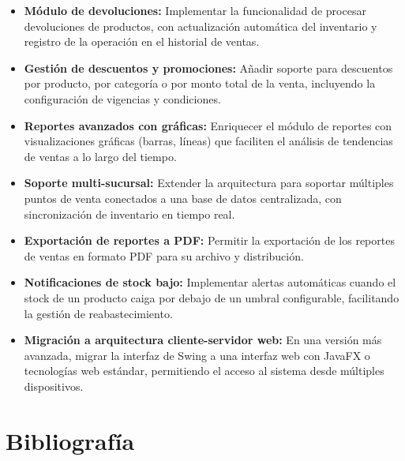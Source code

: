 \documentclass[12pt,a4paper]{report}
\begin{document}
\begin{itemize}
    \item \textbf{Módulo de devoluciones:} Implementar la funcionalidad de procesar devoluciones de productos, con actualización automática del inventario y registro de la operación en el historial de ventas.
    \item \textbf{Gestión de descuentos y promociones:} Añadir soporte para descuentos por producto, por categoría o por monto total de la venta, incluyendo la configuración de vigencias y condiciones.
    \item \textbf{Reportes avanzados con gráficas:} Enriquecer el módulo de reportes con visualizaciones gráficas (barras, líneas) que faciliten el análisis de tendencias de ventas a lo largo del tiempo.
    \item \textbf{Soporte multi-sucursal:} Extender la arquitectura para soportar múltiples puntos de venta conectados a una base de datos centralizada, con sincronización de inventario en tiempo real.
    \item \textbf{Exportación de reportes a PDF:} Permitir la exportación de los reportes de ventas en formato PDF para su archivo y distribución.
    \item \textbf{Notificaciones de stock bajo:} Implementar alertas automáticas cuando el stock de un producto caiga por debajo de un umbral configurable, facilitando la gestión de reabastecimiento.
    \item \textbf{Migración a arquitectura cliente-servidor web:} En una versión más avanzada, migrar la interfaz de Swing a una interfaz web con JavaFX o tecnologías web estándar, permitiendo el acceso al sistema desde múltiples dispositivos.
\end{itemize}

\chapter{Bibliografía}
\end{document}
